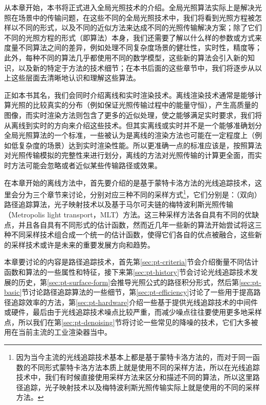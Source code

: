 从本章开始，本书将正式进入全局光照技术的介绍。全局光照算法实际上是解决光照在场景中的传输问题，在这些不同的全局光照技术中，我们将看到光照方程被怎样以不同的形式，以及不同的近似方法来达成不同的光照传输解决方案；除了它们不同的光照方程的形式（即算法）本身，我们还需要了解以什么样的参数或方式来度量不同算法之间的差异，例如处理不同复杂度场景的健壮性，实时性，精度等；此外，每种不同的算法几乎都使用不同的数学模型，这些新的算法会引入新的知识，以及新的特定于方法的技术细节；在本书后面的这些章节中，我们将逐步从以上这些层面去清晰地认识和理解这些算法。

正如本书其名，我们会同时介绍离线和实时渲染技术。离线渲染技术通常是能够计算光照的比较真实的分布（例如保证光照传输过程中的能量守恒），产生高质量的图像，而实时渲染方法则包含了更多的近似处理，使之能够满足实时要求，我们将从离线到实时的方向来介绍这些技术。但其实离线或实时并不是一个能够准确划分全局光照算法的一个标准，一些被认为是离线的渲染方法也可能在一定程度上（例如低复杂度的场景）达到实时渲染性能。所以更准确一点的标准应该是，按照算法对光照传输模拟的完整性来进行划分，离线的方法对光照传输的计算更全面，而实时方法可能会忽略或者近似某些传输路径或效果。

在本章开始的离线方法中，首先要介绍的是基于蒙特卡洛方法的光线追踪技术，这里会分为三个章节来讨论，分别对应三种不同的采样方式\footnote{因为当今主流的光线追踪技术基本上都是基于蒙特卡洛方法的，而对于同一函数的不同形式蒙特卡洛方法本质上就是使用不同的采样方法，所以在光线追踪技术中，我们有时候直接使用采样方法来区分和描述不同的算法，所以这里路径追踪，光子映射技术以及梅特波利斯光照传输实际上就是使用的不同的采样方法。}，它们分别是：（双向）路径追踪算法，光子映射技术以及基于马尔可夫链的梅特波利斯光照传输（Metropolis light transport，MLT）方法。这三种采样方法各自具有不同的优缺点，并且各自具有不同形式的估计函数，然而近几年一些新的算法开始尝试将这三种不同采样技术组合成一个统一的估计函数，使得它们各自的优点被融合，这些新的采样技术或许是未来的重要发展方向和趋势。

本章要讨论的内容是路径追踪技术，首先第\ref{sec:pt-criteria}节会介绍衡量不同估计函数和算法的一些属性和特征，接下来第\ref{sec:pt-history}节会讨论光线追踪技术发展的历史，第\ref{sec:pt-surface-form}会推导光照公式的路径积分形式，然后第\ref{sec:pt-basic}节讨论路径追踪算法的一些细节，第\ref{sec:pt-efficiency}讨论了一些用于提高路径追踪效率的方法，第\ref{sec:pt-hardware}介绍一些基于提供光线追踪技术的中间件或硬件，最后由于光线追踪技术噪点比较严重，而减少噪点往往要使用更多地采样点，所以我们在第\ref{sec:pt-denoising}节将讨论一些常见的降噪的技术，它们大多被用在当前主流的工业渲染器当中。






